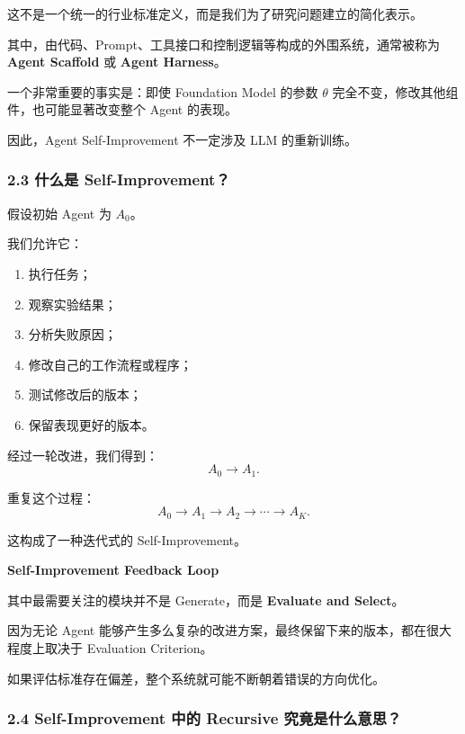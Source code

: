 这不是一个统一的行业标准定义，而是我们为了研究问题建立的简化表示。

其中，由代码、Prompt、工具接口和控制逻辑等构成的外围系统，通常被称为 \textbf{Agent Scaffold} 或 \textbf{Agent Harness}。

一个非常重要的事实是：即使 Foundation Model 的参数 \(\theta\) 完全不变，修改其他组件，也可能显著改变整个 Agent 的表现。

因此，Agent Self-Improvement 不一定涉及 LLM 的重新训练。

\hypertarget{part-1-03-0001-ux4ec0ux4e48ux662f-self-improvement}{%
\subsubsection{2.3 什么是 Self-Improvement？}\label{part-1-03-0001-ux4ec0ux4e48ux662f-self-improvement}}

假设初始 Agent 为 \(A_0\)。

我们允许它：

\begin{enumerate}
\def\labelenumi{\arabic{enumi}.}
\tightlist
\item
  执行任务；
\item
  观察实验结果；
\item
  分析失败原因；
\item
  修改自己的工作流程或程序；
\item
  测试修改后的版本；
\item
  保留表现更好的版本。
\end{enumerate}

经过一轮改进，我们得到：
\[A_0\longrightarrow A_1.\]

重复这个过程：
\[A_0\longrightarrow A_1
\longrightarrow A_2
\longrightarrow\cdots
\longrightarrow A_K.\]

这构成了一种迭代式的 Self-Improvement。

\textbf{Self-Improvement Feedback Loop}


其中最需要关注的模块并不是 Generate，而是 \textbf{Evaluate and Select}。

因为无论 Agent 能够产生多么复杂的改进方案，最终保留下来的版本，都在很大程度上取决于 Evaluation Criterion。

如果评估标准存在偏差，整个系统就可能不断朝着错误的方向优化。

\hypertarget{part-1-03-0001-self-improvement-ux4e2dux7684-recursive-ux7a76ux7adfux662fux4ec0ux4e48ux610fux601d}{%
\subsubsection{2.4 Self-Improvement 中的 Recursive 究竟是什么意思？}\label{part-1-03-0001-self-improvement-ux4e2dux7684-recursive-ux7a76ux7adfux662fux4ec0ux4e48ux610fux601d}}

